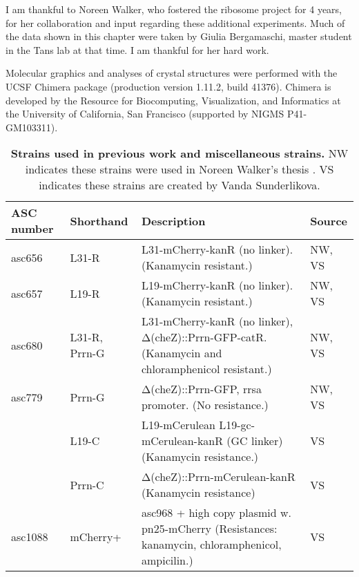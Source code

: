 %
I am thankful to Noreen Walker, who fostered the ribosome project for 4 years, for her collaboration and input regarding these additional experiments.
%
Much of the data shown in this chapter were taken by Giulia Bergamaschi, master student in the Tans lab at that time. I am thankful for her hard work. 

Molecular graphics and analyses 
of crystal structures
%
were performed with the UCSF Chimera package (production version 1.11.2, build 41376). Chimera is developed by the Resource for Biocomputing, Visualization, and Informatics at the University of California, San Francisco (supported by NIGMS P41-GM103311). 







\begin{table}[h]
    \begin{tabularx}{\textwidth}{llXl}
        \textbf{ASC number}	& \textbf{Shorthand} & \textbf{Description} & \textbf{Source}		\\
        \hline
        asc656	& L31-R & L31-mCherry-kanR (no linker).	(Kanamycin resistant.) & NW, VS \\
        asc657	& L19-R & L19-mCherry-kanR (no linker).	(Kanamycin resistant.) & NW, VS \\
        asc680	& L31-R, Prrn-G & L31-mCherry-kanR (no linker), Δ(cheZ)::Prrn-GFP-catR. (Kanamycin and chloramphenicol resistant.)	& NW, VS \\
        asc779	& Prrn-G& Δ(cheZ)::Prrn-GFP, rrsa promoter. (No resistance.) &	NW, VS \\
        
        \hline										
        & L19-C & 	L19-mCerulean L19-gc-mCerulean-kanR (GC linker)	(Kanamycin resistance.)	& VS \\
        & Prrn-C & 	Δ(cheZ)::Prrn-mCerulean-kanR	(Kanamycin resistance)	& VS \\
        \hline
        asc1088 & mCherry+
        &	asc968 + high copy plasmid w. pn25-mCherry (Resistances: kanamycin, chloramphenicol, ampicilin.) & VS \\
        \hline
    \end{tabularx}
    \caption{\textbf{Strains used in previous work and miscellaneous strains.} NW indicates these strains were used in Noreen Walker's thesis \cite{Walker2016t}. VS indicates these strains are created by Vanda Sunderlikova.}
\end{table}


